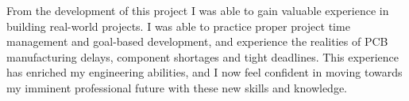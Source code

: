From the development of this project I was able to gain valuable experience in building real-world projects. I was able to practice proper project time management and goal-based development, and experience the realities of PCB manufacturing delays, component shortages and tight deadlines. This experience has enriched my engineering abilities, and I now feel confident in moving towards my imminent professional future with these new skills and knowledge.